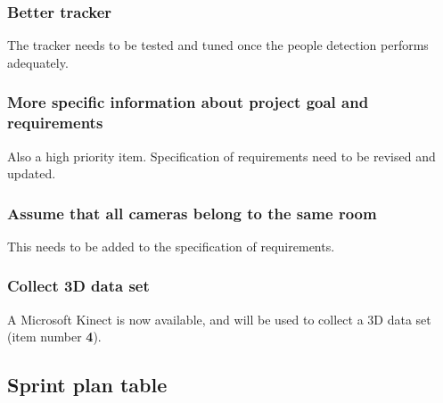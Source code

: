 \subsubsection{Better tracker}
The tracker needs to be tested and tuned once the people detection performs adequately.

\subsubsection{More specific information about project goal and requirements}
Also a high priority item. Specification of requirements need to be revised and updated.

\subsubsection{Assume that all cameras belong to the same room}
This needs to be added to the specification of requirements.

\subsubsection{Collect 3D data set}
A Microsoft Kinect is now available, and will be used to collect a 3D data set (item number \textbf{4}).


\newpage

\subsection{Sprint plan table}

